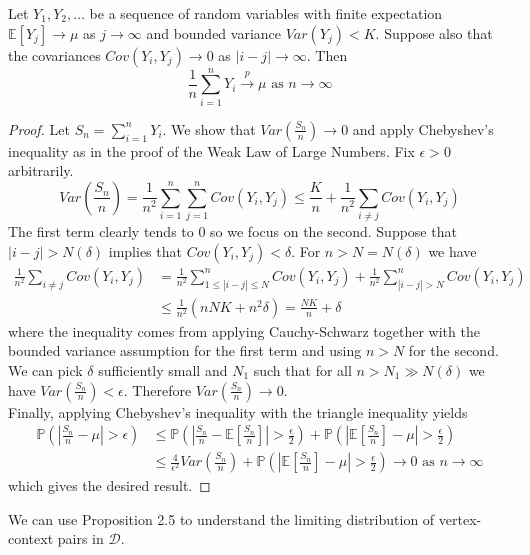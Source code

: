 \documentclass[a4paper]{article}
\renewcommand{\P}{\mathbb P}
\renewcommand{\E}{\mathbb E}
\newcommand{\D}{\mathcal D}
\begin{document}
\begin{proposition}
  Let $Y_1,Y_2, \dots$ be a sequence of random variables with finite expectation $\E[Y_j] \to \mu$ as $j \to \infty$ and bounded variance $Var(Y_j) < K$. Suppose also that the covariances $Cov(Y_i, Y_j) \to 0$ as $|i-j| \to \infty$. Then
  \[\frac{1}{n}\sum_{i = 1}^n Y_i \overset{p}{\longrightarrow} \mu \text{ as } n \to \infty\]
\end{proposition}
\begin{proof}
  Let $S_n = \sum_{i=1}^n Y_i$. We show that $Var\left(\frac{S_n}{n}\right) \to 0$ and apply Chebyshev's inequality as in the proof of the Weak Law of Large Numbers. Fix $\epsilon > 0$ arbitrarily.\\
  \[Var\left(\frac{S_n}{n}\right) = \frac{1}{n^2} \sum_{i=1}^n\sum_{j=1}^n Cov(Y_i, Y_j) \leq \frac{K}{n} + \frac{1}{n^2}\sum_{i \neq j}Cov(Y_i, Y_j)\]
  The first term clearly tends to 0 so we focus on the second. Suppose that $|i-j| > N(\delta)$ implies that $Cov(Y_i, Y_j) < \delta$. For $n > N = N(\delta)$ we have
  \begin{align*}
    \frac{1}{n^2}\sum_{i \neq j}Cov(Y_i, Y_j)&=\frac{1}{n^2}\sum_{1 \leq |i-j| \leq N}^n Cov(Y_i, Y_j) + \frac{1}{n^2}\sum_{|i-j| > N}^n Cov(Y_i, Y_j)\\
    &\leq \frac{1}{n^2}\left(nNK + n^2\delta\right) = \frac{NK}{n} + \delta
  \end{align*}
  where the inequality comes from applying Cauchy-Schwarz together with the bounded variance assumption for the first term and using $n > N$ for the second. We can pick $\delta$ sufficiently small and $N_1$ such that for all $n > N_1 \gg N(\delta)$ we have $Var\left(\frac{S_n}{n}\right) < \epsilon$. Therefore $Var\left(\frac{S_n}{n}\right) \to 0$.\\
  Finally, applying Chebyshev's inequality with the triangle inequality yields
  \begin{align*}
  \P\left(\left| \frac{S_n}{n} - \mu\right| > \epsilon \right) &\leq \P\left(\left| \frac{S_n}{n} - \E\left[\frac{S_n}{n}\right]\right| > \frac{\epsilon}{2} \right) + \P\left(\left| \E\left[\frac{S_n}{n}\right] - \mu\right| > \frac{\epsilon}{2} \right)\\
  &\leq \frac{4}{\epsilon^2}Var\left(\frac{S_n}{n}\right) + \P\left(\left| \E\left[\frac{S_n}{n}\right] - \mu\right| > \frac{\epsilon}{2} \right) \to 0 \text{ as } n \to \infty
\end{align*}
  which gives the desired result.
\end{proof}
We can use Proposition 2.5 to understand the limiting distribution of vertex-context pairs in $\D$.
\end{document}
